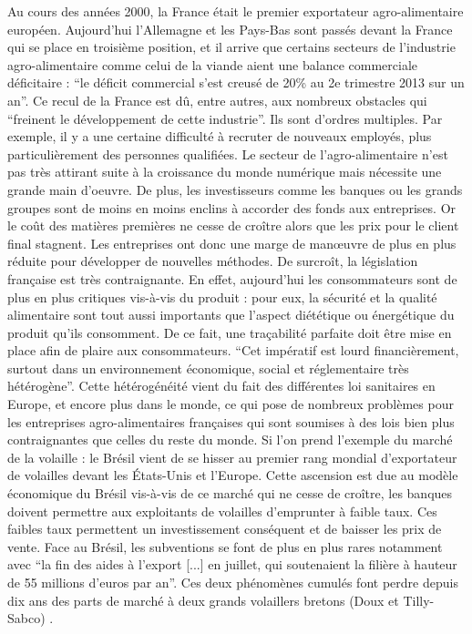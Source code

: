\documentclass[a4paper,12pt]{report}
\begin{document}
			Au cours des années 2000, la France était le premier exportateur agro-alimentaire européen. Aujourd'hui l’Allemagne et les Pays-Bas sont passés devant la France qui se place en troisième position, et il arrive que certains secteurs de l’industrie agro-alimentaire comme celui de la viande aient une balance commerciale déficitaire : “le déficit commercial s'est creusé de 20\% au 2e trimestre 2013 sur un an”\cite{DeficitCommercialViandeAggrave}.
			Ce recul de la France est dû, entre autres, aux nombreux obstacles qui “freinent le développement de cette industrie”\cite{StimulerCompetitiviteEntreprises}. Ils sont d’ordres multiples. Par exemple, il y a une certaine difficulté à recruter de nouveaux employés, plus particulièrement des personnes qualifiées. Le secteur de l’agro-alimentaire n’est pas très attirant suite à la croissance du monde numérique mais nécessite une grande main d’oeuvre.
			De plus, les investisseurs comme les banques ou les grands groupes sont de moins en moins enclins à accorder des fonds aux entreprises. Or le coût des matières premières ne cesse de croître alors que les prix pour le client final stagnent. Les entreprises ont donc une marge de manœuvre de plus en plus réduite pour développer de nouvelles méthodes. De surcroît, la législation française est très contraignante. En effet, aujourd’hui les consommateurs sont de plus en plus critiques vis-à-vis du produit : pour eux, la sécurité et la qualité alimentaire sont tout aussi importants que l’aspect diététique ou énergétique du produit qu’ils consomment. De ce fait, une traçabilité parfaite doit être mise en place afin de plaire aux consommateurs. “Cet impératif est lourd financièrement, surtout dans un environnement économique, social et réglementaire très hétérogène”\cite{SecteurAAFrancaisEnjeuxXXISiecle}. Cette hétérogénéité vient du fait des différentes loi sanitaires en Europe, et encore plus dans le monde, ce qui pose de nombreux problèmes pour les entreprises agro-alimentaires françaises qui sont soumises à des lois bien plus contraignantes que celles du reste du monde. Si l’on prend l’exemple du marché de la volaille : le Brésil vient de se hisser au premier rang mondial d’exportateur de volailles devant les États-Unis et l’Europe. Cette ascension est due au modèle économique du Brésil vis-à-vis de ce marché qui ne cesse de croître, les banques doivent permettre aux exploitants de volailles d'emprunter à faible taux. Ces faibles taux permettent un investissement conséquent et de baisser les prix de vente. Face au Brésil, les subventions se font de plus en plus rares notamment avec “la fin des aides à l'export [...] en juillet, qui soutenaient la filière à hauteur de 55 millions d'euros par an”.\cite{PouletBresilienMoinsCherBreton} Ces deux phénomènes cumulés font perdre depuis dix ans des parts de marché à deux grands volaillers bretons (Doux et Tilly-Sabco) .
			
\end{document}
